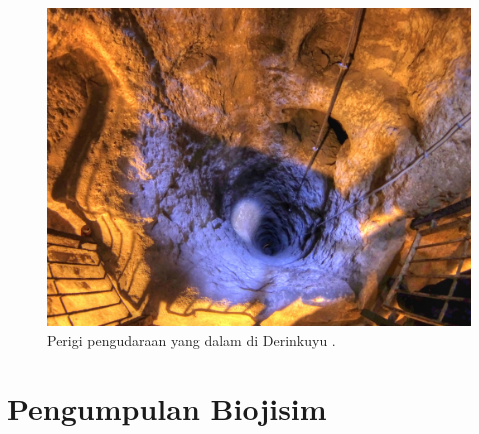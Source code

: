 \documentclass[10pt,twocolumn,letterpaper]{article}
\begin{document}
\begin{figure}[t]
\begin{center}
   \includegraphics[width=1\linewidth]{derinkuyu-air.jpg}
\end{center}
   \caption{Perigi pengudaraan yang dalam di Derinkuyu \cite{53}.}
\label{fig:6}

\label{fig:onecol}
\end{figure}



\section{Pengumpulan Biojisim}
\end{document}
